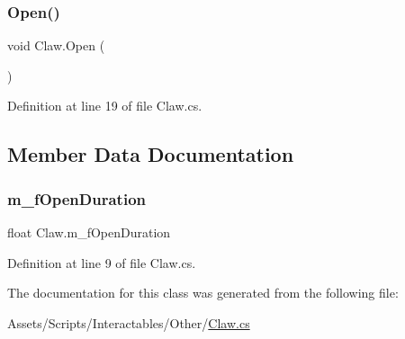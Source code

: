 \subsubsection{\texorpdfstring{Open()}{Open()}}
{\footnotesize\ttfamily void Claw.\+Open (\begin{DoxyParamCaption}{ }\end{DoxyParamCaption})}



Definition at line 19 of file Claw.\+cs.



\subsection{Member Data Documentation}
\mbox{\label{class_claw_a0a052f90ac57ead7e8b56b6fe73bd482}} 
\subsubsection{\texorpdfstring{m\+\_\+f\+Open\+Duration}{m\_fOpenDuration}}
{\footnotesize\ttfamily float Claw.\+m\+\_\+f\+Open\+Duration}



Definition at line 9 of file Claw.\+cs.



The documentation for this class was generated from the following file\+:\begin{DoxyCompactItemize}
\item 
Assets/\+Scripts/\+Interactables/\+Other/\mbox{\hyperlink{_claw_8cs}{Claw.\+cs}}\end{DoxyCompactItemize}
